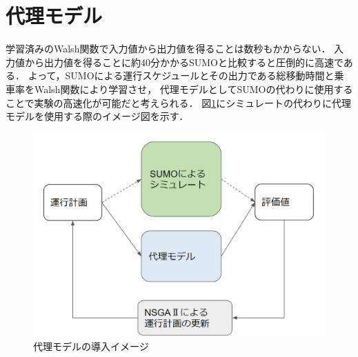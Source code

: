 \documentclass[main]{subfiles}
\begin{document}
    \section{代理モデル}
    学習済みのWalsh関数で入力値から出力値を得ることは数秒もかからない．
    入力値から出力値を得ることに約40分かかるSUMOと比較すると圧倒的に高速である．
    よって，SUMOによる運行スケジュールとその出力である総移動時間と乗車率をWalsh関数により学習させ，
    代理モデルとしてSUMOの代わりに使用することで実験の高速化が可能だと考えられる．
    図\ref{dairi}にシミュレートの代わりに代理モデルを使用する際のイメージ図を示す．
    \begin{figure}
        \centering
        \includegraphics[width=\linewidth]{figures/dairi.png}
        \caption{代理モデルの導入イメージ}
        \label{dairi}
    \end{figure}
\end{document}
